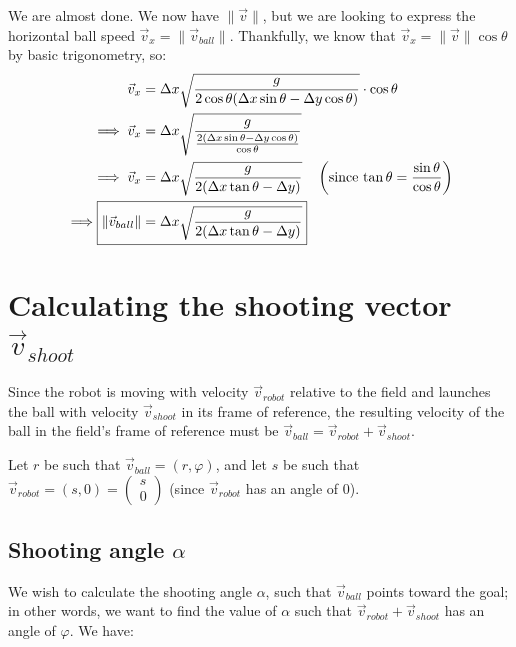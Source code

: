 \documentclass[11pt]{report}
\begin{document}
We are almost done. We now have $\|\vec{v}\|$, but we are looking to express the horizontal ball speed $\vec{v}_x = \|\vec{v}_{ball}\|$. Thankfully, we know that $\vec{v}_x = \|\vec{v}\| \cos\theta$ by basic trigonometry, so:
\[
	\begin{aligned}
		\vec{v}_x          & = \Delta x \sqrt{\frac{g}{2\cos\theta (\Delta x \sin\theta - \Delta y \cos\theta) }} \cdot \cos\theta \\
		\implies \vec{v}_x
		                   & = \Delta x \sqrt{\frac{g}{\frac{2 (\Delta x \sin\theta - \Delta y \cos\theta)}{\cos\theta} }}         \\
		\implies
		\vec{v}_x          & = \Delta x \sqrt{\frac{g}{2 (\Delta x \tan\theta - \Delta y)}}
		\quad \left(\text{since $\tan\theta = \frac{\sin\theta}{\cos\theta}$}\right)                                               \\
		\implies
		\Aboxed{
		\|\vec{v}_{ball}\| & = \Delta x \sqrt{\frac{g}{2 (\Delta x \tan\theta - \Delta y)}}
		}
	\end{aligned}
\]


\section{Calculating the shooting vector \texorpdfstring{$\vec{v}_{shoot}$}{v\_shoot}}

Since the robot is moving with velocity $\vec{v}_{robot}$ relative to the field and launches the ball with velocity $\vec{v}_{shoot}$ in its frame of reference, the resulting velocity of the ball in the field's frame of reference must be $\vec{v}_{ball} = \vec{v}_{robot} + \vec{v}_{shoot}$.

Let $r$ be such that $\vec{v}_{ball} = (r,
	\varphi)$, and let $s$ be such that $\vec{v}_{robot} = (s, 0) = \begin{pmatrix}
		s \\
		0
	\end{pmatrix}$ (since $\vec{v}_{robot}$ has an angle of 0).

\subsection{Shooting angle \texorpdfstring{$\alpha$}{α}}

We wish to calculate the shooting angle $\alpha$,
such that $\vec{v}_{ball}$ points toward the goal; in other words, we want to
find the value of $\alpha$ such that $\vec{v}_{robot} + \vec{v}_{shoot}$ has an angle of $\varphi$. We have:
\end{document}
